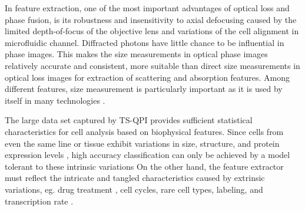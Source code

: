 \documentclass[aps,pra,reprint,longbibliography,superscriptaddress]{revtex4-1}
\begin{document}
In feature extraction, one of the most important advantages of optical loss and phase fusion, is its robustness and insensitivity to axial defocusing \cite{spadinger1990effect} caused by the limited depth-of-focus of the objective lens and variations of the cell alignment in microfluidic channel. Diffracted photons have little chance to be influential in phase images. This makes the size measurements in optical phase images relatively accurate and consistent, more suitable than direct size measurements in optical loss images for extraction of scattering and absorption features. Among different features, size measurement is particularly important as it is used by itself in many technologies \cite{adams2008highly, nagrath2007isolation, vona2000isolation, gossett2010label}.  

The large data set captured by TS-QPI provides sufficient statistical characteristics for cell analysis based on biophysical features. Since cells from even the same line or tissue exhibit variations in size, structure, and protein expression levels \cite{kaern2005stochasticity, maheshri2007living, zangle2014live}, high accuracy classification can only be achieved by a model tolerant to these intrinsic variations 
On the other hand, the feature extractor must reflect the intricate and tangled characteristics caused by extrinsic variations, eg. drug treatment \cite{spencer2009non}, cell cycles, rare cell types, labeling, and transcription rate \cite{johnston2012mitochondrial}. 
\end{document}
